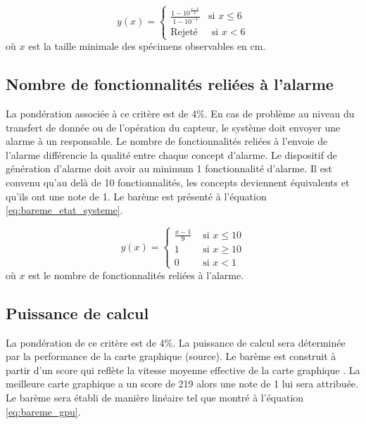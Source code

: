 \begin{equation}
y(x) = \begin{cases}
        \frac{1-10^{\frac{x-6}{6}}}{1-10^{-1}} & \text{si } x \leq 6\\
        \text{Rejeté} & \text{ si } x < 6
    \end{cases}
    \label{eq:bareme_taille_poisson}
\end{equation}
où $x$ est la taille minimale des spécimens observables en cm.



\subsection{Nombre de fonctionnalités reliées à l'alarme}
\label{nombrefonc}

La pondération associée à ce critère est de 4\%. En cas de problème au niveau du transfert de donnée ou de l'opération du capteur, le système doit envoyer une alarme à un responsable. Le nombre de fonctionnalités reliées à l'envoie de l'alarme différencie la qualité entre chaque concept d'alarme. Le dispositif de génération d'alarme doit avoir au minimum 1 fonctionnalité d'alarme. Il est convenu qu'au delà de 10 fonctionnalités, les concepts deviennent équivalents et qu'ils ont une note de 1. Le barème est présenté à l'équation \ref{eq:bareme_etat_systeme}.

\begin{equation}
    y(x) = \begin{cases}
    \frac{x-1}{9} & \text{ si } x \leq 10\\
    1 & \text{ si } x \geq 10\\
    0 & \text{ si } x < 1
    \end{cases}
    \label{eq:bareme_etat_systeme}
\end{equation}
où $x$ est le nombre de fonctionnalités reliées à l'alarme.

\subsection{Puissance de calcul}
\label{puisca}

La pondération de ce critère est de 4\%. La puissance de calcul sera déterminée par la performance de la carte graphique (source). Le barème est construit à partir d'un score qui reflète la vitesse moyenne effective de la carte graphique \cite{User_Benchmark_score}. La meilleure carte graphique a un score de 219 alors une note de 1 lui sera attribuée. Le barème sera établi de manière linéaire tel que montré à l'équation \ref{eq:bareme_gpu}.


